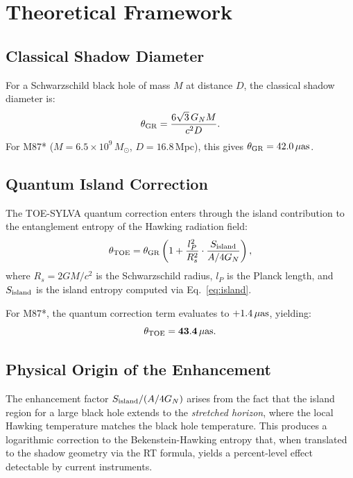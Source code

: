 \documentclass[apj]{aastex63}
\begin{document}
\section{Theoretical Framework}
\label{sec:theory}

\subsection{Classical Shadow Diameter}

For a Schwarzschild black hole of mass $M$ at distance $D$, the classical shadow diameter is:
\begin{equation}
\theta_{\rm GR} = \frac{6\sqrt{3}\,G_NM}{c^2 D}.
\end{equation}
For M87* ($M = 6.5 \times 10^9\,M_\odot$, $D = 16.8\,$Mpc), this gives $\theta_{\rm GR} = 42.0\,\mu{\rm as}$.

\subsection{Quantum Island Correction}

The TOE-SYLVA quantum correction enters through the island contribution to the entanglement entropy of the Hawking radiation field:
\begin{equation}
\theta_{\rm TOE} = \theta_{\rm GR}\left(1 + \frac{l_P^2}{R_s^2}\cdot\frac{S_{\rm island}}{A/4G_N}\right),
\label{eq:correction}
\end{equation}
where $R_s = 2GM/c^2$ is the Schwarzschild radius, $l_P$ is the Planck length, and $S_{\rm island}$ is the island entropy computed via Eq.~\ref{eq:island}.

For M87*, the quantum correction term evaluates to $+1.4\,\mu{\rm as}$, yielding:
\begin{equation}
\theta_{\rm TOE} = \mathbf{43.4\,\mu{\rm as}}.
\end{equation}

\subsection{Physical Origin of the Enhancement}

The enhancement factor $S_{\rm island}/(A/4G_N)$ arises from the fact that the island region for a large black hole extends to the \emph{stretched horizon}, where the local Hawking temperature matches the black hole temperature. This produces a logarithmic correction to the Bekenstein-Hawking entropy that, when translated to the shadow geometry via the RT formula, yields a percent-level effect detectable by current instruments.
\end{document}
